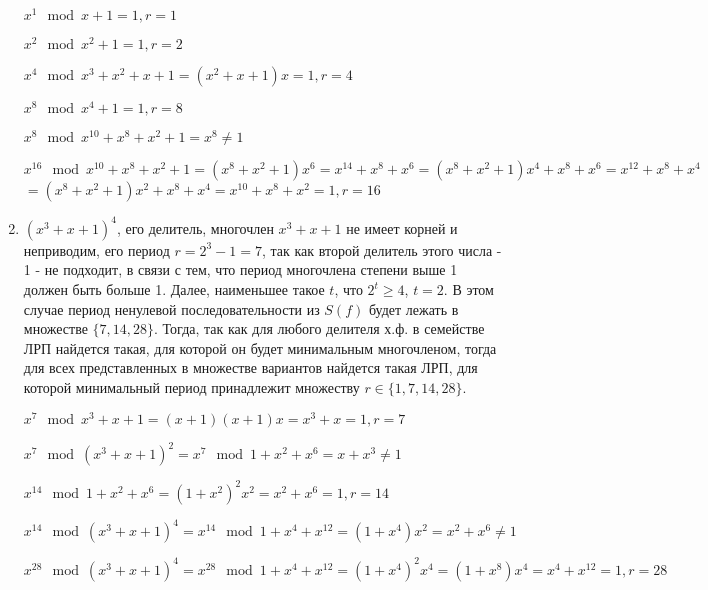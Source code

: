\documentclass[12pt]{extarticle}
\begin{document}
\begin{enumerate}
    $x^1 \mod x+1 = 1, r = 1$
    
    $x^2 \mod x^2+1 = 1, r = 2$
    
    $x^4 \mod x^3 + x^2 + x +1 = (x^2 + x + 1) x = 1, r = 4$
    
    $x^8 \mod x^4+1 = 1, r = 8$
    
    $x^8 \mod x^{10} +x^8 + x^2 + 1 = x^8 \neq 1$
    
    $x^{16} \mod x^{10} +x^8 + x^2 + 1  = (x^8 + x^2 + 1) x^6 = x^{14} + x^8 + x^6 = (x^8 + x^2 + 1) x^4 + x^8 + x^6 = x^{12} + x^8 + x^4$
    $ = (x^8 + x^2 + 1) x^2 + x^8 + x^4 = x^{10} + x^8 + x^2 = 1, r = 16$
    
    \item $(x^3+x+1)^4$, его делитель, многочлен $x^3+x+1$ не имеет корней и неприводим, его период $r = 2^3 -1 = 7$, так как второй делитель этого числа - 1 - не подходит, в связи с тем, что период многочлена степени выше 1 должен быть больше 1. Далее, наименьшее такое $t$, что $2^t \geq 4$, $t=2$. В этом случае период ненулевой последовательности из $S(f)$ будет лежать в множестве $\{7, 14, 28\}$. Тогда, так как для любого делителя х.ф. в семействе ЛРП найдется такая, для которой он будет минимальным многочленом, тогда для всех представленных в множестве вариантов найдется такая ЛРП, для которой минимальный период принадлежит множеству $r \in \{1, 7, 14, 28 \}$.
    
    $x^7 \mod x^3+x+1 = (x+1)(x+1)x = x^3 + x = 1, r = 7$
    
    $x^7 \mod (x^3+x+1)^2 = x^7 \mod 1+x^2+x^6 = x+x^3 \neq 1$
    
    $x^{14} \mod 1+x^2+x^6 = (1+x^2)^2 x^2 = x^2 + x^6 = 1, r = 14$
    
    $x^{14} \mod (x^3+x+1)^4 = x^{14} \mod 1 + x^4 + x^{12} = (1+x^4) x^2 = x^2 + x^6 \neq 1$
    
    $x^{28} \mod (x^3+x+1)^4 = x^{28} \mod 1 + x^4 + x^{12} = (1+x^4)^2 x^4 = (1 + x^8) x^4 = x^4 + x^{12} = 1, r = 28$
    

\end{enumerate}
\end{document}
